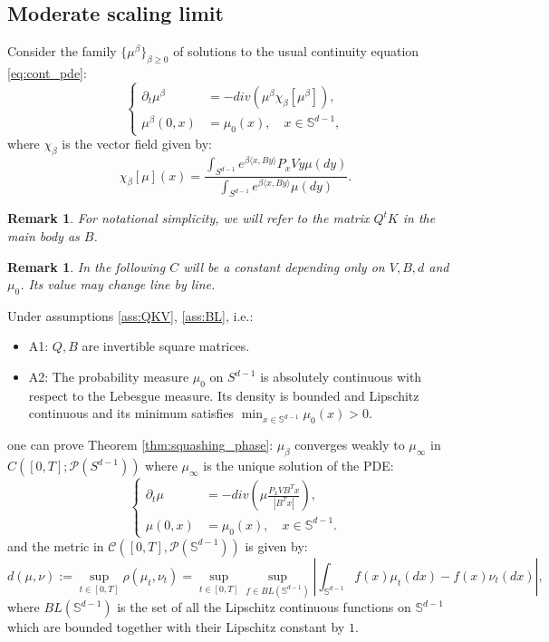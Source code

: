 \documentclass{article}
\numberwithin{theorem}{section}
\newtheorem{remark}[theorem]{Remark}
\begin{document}
\label{app:proofs}
\subsection{Moderate scaling limit}
\label{app:first_phase_proof}
Consider the family $\{\mu^\beta\}_{\beta\geq0}$ of solutions to the usual continuity equation \eqref{eq:cont_pde}:
$$
\begin{cases}
    \partial_t \mu^\beta &= - div(\mu^\beta \chi_\beta[\mu^\beta]), \\
    \mu^\beta(0,x) &= \mu_0(x), \quad x \in \mathbb{S}^{d-1},
\end{cases}
$$
where $\chi_\beta$ is the vector field given by:
$$
\chi_\beta[\mu](x)=\frac{\int_{S^{d-1}} e^{\beta \langle x , By\rangle}P_xVy \mu(dy)}{\int_{S^{d-1}} e^{\beta \langle x , By\rangle} \mu(dy)}.
$$
\begin{remark}
   For notational simplicity, we will refer to the matrix $Q^tK$ in the main body as $B$.
\end{remark}
\begin{remark}
    In the following $C$ will be a constant depending only on $V, B, d$ and $\mu_0$. Its value may change line by line.
\end{remark}

Under assumptions \ref{ass:QKV}, \ref{ass:BL}, i.e.:
\begin{itemize}
    \item A1: $Q,B$ are invertible square matrices.
    \item A2: The probability measure $\mu_0$ on $S^{d-1}$ is absolutely continuous with respect to the Lebesgue measure. Its density is bounded and Lipschitz continuous and its minimum satisfies $\min_{x\in\mathbb{S}^{d-1}}\mu_0(x) > 0$. 
\end{itemize}
one can prove Theorem \ref{thm:squashing_phase}: $\mu_\beta$ converges weakly to $\mu_\infty$ in $C([0,T];\mathcal{P}(S^{d-1}))$ where $\mu_\infty$ is the unique solution of the PDE:
$$
\begin{cases}
    \partial_t \mu &= - div(\mu \frac{P_xVB^Tx}{|B^Tx|}), \\
    \mu(0,x) &= \mu_0(x), \quad x \in \mathbb{S}^{d-1}.
\end{cases}
$$
and the metric in $\mathcal{C}([0,T],\mathcal{P}(\mathbb{S}^{d-1}))$ is given by:
$$
d(\mu,\nu):=\sup_{t\in[0,T]}\rho(\mu_t,\nu_t)=\sup_{t\in[0,T]}\sup_{f\in BL(\mathbb{S}^{d-1})} \left|\int_{\mathbb{S}^{d-1}} f(x) \mu_t(dx) -f(x)\nu_t(dx)\right|,
$$
where $BL(\mathbb{S}^{d-1})$ is the set of all the Lipschitz continuous functions on $\mathbb{S}^{d-1}$ which are bounded together with their Lipschitz constant by $1$.
\end{document}
